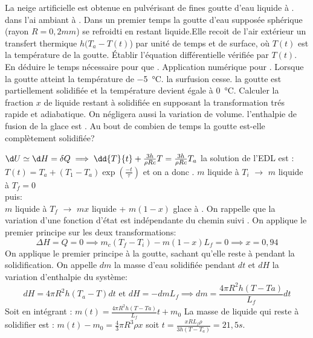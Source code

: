 \begin{Exercise}[title=Formation de la neige artificielle]
		La neige artificielle est obtenue en pulvérisant de fines goutte d'eau liquide à .
		dans l'ai ambiant à .
		\Question Dans un premier temps la goutte d'eau supposée sphérique (rayon $R=0,2mm$) se refroidti en restant liquide.Elle recoit de l'air extérieur un transfert thermique $h(T_a-T(t)$) par unité de temps et de surface, où $T(t)$ est la température de la goutte.
		\subQuestion Établir l'équation différentielle vérifiée par $T(t)$.
		\subQuestion En déduire le temps nécessaire pour que . Application numérique pour .
		\Question
		\subQuestion Lorsque la goutte atteint la température de \SI{-5}{\degreeCelsius}. la surfusion cesse. la goutte est partiellement solidifiée et la température devient égale à \SI{0}{\degreeCelsius}. Calculer la fraction $x$ de liquide restant à solidifiée en supposant la transformation trés rapide et adiabatique. On négligera aussi la variation de volume. l'enthalpie de fusion de la glace est .
		\subQuestion Au bout de combien de temps la goutte est-elle complètement solidifiée?
\end{Exercise}
\begin{Answer}
		\Question
		\subQuestion $\d U \simeq \d H = \delta Q \implies \dd{T}{t} + \frac{3h}{\rho Rc}T = \frac{3h}{\rho R c} T_a$
		\subQuestion la solution de l'EDL est  : $T(t)=T_a+(T_1-T_a)\exp\left(\frac{-t}{\tau}\right)$ et on a donc .
		\Question $m$ liquide à $T_i$ $\to$ $m$ liquide à $T_f=0$\\
		 puis:\\
		$m$ liquide à $T_f$ $\to$ $mx$ liquide + $m(1-x)$ glace à .
		On rappelle que la variation d'une fonction d'état est indépendante du chemin  suivi . On applique le premier principe sur les deux transformations:
		\[\Delta H = Q= 0 \implies m_c(T_f-T_i)-m(1-x)L_f=0 \implies x= 0,94 \]
		On applique le premier principe à la goutte, sachant qu'elle reste à  pendant la solidification. On appelle $dm$ la masse d'eau solidifiée pendant $dt$ et $dH$ la variation d'enthalpie du système:
		\[dH = 4\pi R^2h (T_a-T)dt \text{ et } dH = -dmL_f \implies dm=\frac{4\pi R^2h(T-Ta)}{L_f}dt\]
		Soit en intégrant :
		$m(t) = \frac{4\pi R^2h(T-Ta)}{L_f}t+ m_0$ La masse de liquide qui reste à solidifier est : $m(t)-m_0 =\frac{4}{3}\pi R^3 \rho x $ soit $t= \frac{xRL_f\rho}{3h(T-T_a)} = 21,5s$.
\end{Answer}

